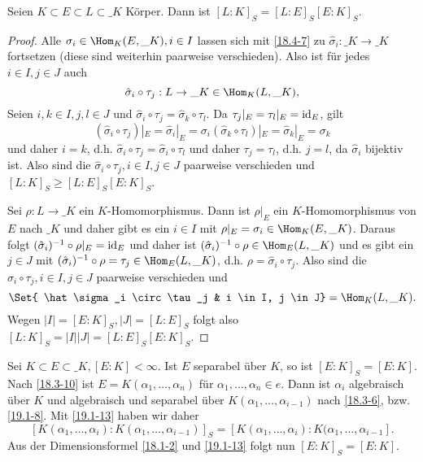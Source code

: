 \begin{st} \label{19.1-13}
	Seien $K \subset E \subset L \subset \_K$ Körper.
	Dann ist $[L : K]_S = [L : E]_S [E : K]_S$.
	\begin{proof}
		Alle $\sigma_i \in \Hom_{K}(E, \_K), i \in I$ lassen sich mit \ref{18.4-7} zu $\hat \sigma_i: \_K \to \_K$ fortsetzen (diese sind weiterhin paarweise verschieden).
		Also ist für jedes $i \in I, j \in J$ auch
		\[
			\hat \sigma_i \circ \tau_j: L \to \_K \in \Hom_K(L, \_K),
		\]
		Seien $i, k \in I, j, l \in J$ und $\hat \sigma_i \circ \tau_j = \hat \sigma_k \circ \tau_l$.
		Da $\tau_j|_E = \tau_l|_E = \operatorname{id}_E$, gilt
		\[
			(\hat \sigma_i \circ \tau_j)|_E = \hat \sigma_i|_E = \sigma_i
			(\hat \sigma_k \circ \tau_l)|_E = \hat \sigma_k|_E = \sigma_k
		\]
		und daher $i = k$, d.h. $\hat \sigma_i \circ \tau_j = \hat \sigma_i \circ \tau_l$ und daher $\tau_j = \tau_l$, d.h. $j = l$, da $\hat \sigma_i$ bijektiv ist.
		Also sind die $\hat \sigma_i \circ \tau_j, i \in I, j \in J$ paarweise verschieden und $[L:K]_S \ge [L:E]_S [E:K]_S$.

		Sei $\rho: L \to \_K$ ein $K$-Homomorphismus.
		Dann ist $\rho|_E$ ein $K$-Homomorphismus von $E$ nach $\_K$ und daher gibt es ein $i \in I$ mit $\rho|_E = \sigma_i \in \Hom_K(E, \_K)$.
		Daraus folgt $(\hat \sigma_i)^{-1} \circ \rho|_E = \operatorname{id}_E$ und daher ist $(\hat \sigma_i)^{-1} \circ \rho \in \Hom_E (L, \_K)$ und es gibt ein $j \in J$ mit $(\hat \sigma_i)^{-1} \circ \rho = \tau_j \in \Hom_E (L, \_K)$, d.h. $\rho = \hat \sigma_i \circ \tau_j$.
		Also sind die $\hat \sigma_i \circ \tau_j, i \in I, j \in J$ paarweise verschieden und
		\[
			\Set{ \hat \sigma_i \circ \tau_j & i \in I, j \in J}
			= \Hom_K(L, \_K).
		\]
		Wegen $|I| = [E : K]_S, |J| = [L: E]_S$ folgt also $[L:K]_S = |I| |J| = [L:E]_S [E:K]_S$.
	\end{proof}
\end{st}

\begin{lem} \label{19.1-14}
	Sei $K \subset E \subset \_K, [E : K] < \infty$.
	Ist $E$ separabel über $K$, so ist $[E : K]_S = [E : K]$.
	Nach \ref{18.3-10} ist $E = K(\alpha_1, \dotsc, \alpha_n)$ für $\alpha_1, \dotsc, \alpha_n \in e$.
	Dann ist $\alpha_i$ algebraisch über $K$ und algebraisch und separabel über $K(\alpha_1, \dotsc, \alpha_{i-1})$ nach \ref{18.3-6}, bzw. \ref{19.1-8}.
	Mit \ref{19.1-13} haben wir daher
	\[
		[K(\alpha_1, \dotsc, \alpha_i) : K(\alpha_1, \dotsc, \alpha_{i-1})]_S
		= [K(\alpha_1, \dotsc, \alpha_i) : K(\alpha_1, \dotsc, \alpha_{i-1}].
	\]
	Aus der Dimensionsformel \ref{18.1-2} und \ref{19.1-13} folgt nun $[E:K]_S = [E:K]$.
\end{lem}

